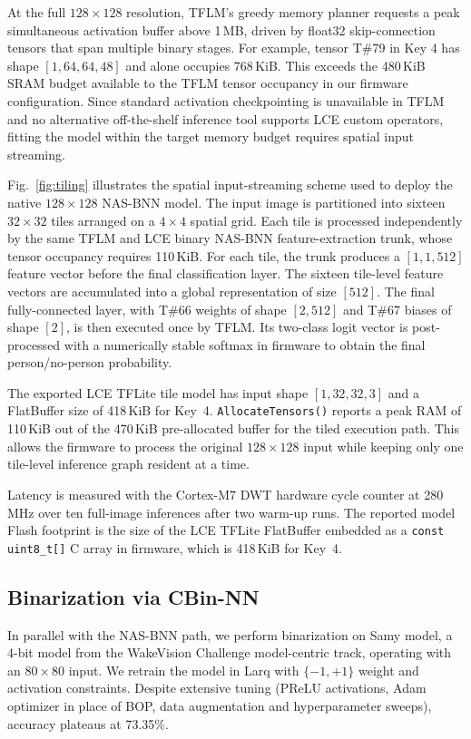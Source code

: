 \documentclass[conference]{IEEEtran}
\begin{document}
At the full $128 \times 128$ resolution, TFLM's greedy memory planner requests a peak simultaneous activation buffer above 1\,MB, driven by float32 skip-connection tensors that span multiple binary stages.
For example, tensor T\#79 in Key 4 has shape $[1,64,64,48]$ and alone occupies 768\,KiB.
This exceeds the 480\,KiB SRAM budget available to the TFLM tensor occupancy in our firmware configuration.
Since standard activation checkpointing is unavailable in TFLM and no alternative off-the-shelf inference tool supports LCE custom operators, fitting the model within the target memory budget requires spatial input streaming.

Fig.~\ref{fig:tiling} illustrates the spatial input-streaming scheme used to deploy the native $128 \times 128$ NAS-BNN model.
The input image is partitioned into sixteen $32 \times 32$ tiles arranged on a $4 \times 4$ spatial grid.
Each tile is processed independently by the same TFLM and LCE binary NAS-BNN feature-extraction trunk, whose tensor occupancy requires 110\,KiB.
For each tile, the trunk produces a $[1,1,512]$ feature vector before the final classification layer.
The sixteen tile-level feature vectors are accumulated into a global representation of size $[512]$.
The final fully-connected layer, with T\#66 weights of shape $[2,512]$ and T\#67 biases of shape $[2]$, is then executed once by TFLM.
Its two-class logit vector is post-processed with a numerically stable softmax in firmware to obtain the final person/no-person probability.

The exported LCE TFLite tile model has input shape $[1,32,32,3]$ and a FlatBuffer size of 418\,KiB for Key~4.
\texttt{AllocateTensors()} reports a peak RAM of 110\,KiB out of the 470\,KiB pre-allocated buffer for the tiled execution path.
This allows the firmware to process the original $128 \times 128$ input while keeping only one tile-level inference graph resident at a time.

Latency is measured with the Cortex-M7 DWT hardware cycle counter at 280\,MHz over ten full-image inferences after two warm-up runs.
The reported model Flash footprint is the size of the LCE TFLite FlatBuffer embedded as a \texttt{const uint8\_t[]} C array in firmware, which is 418\,KiB for Key~4.

\subsection{Binarization via CBin-NN}
\label{subsec:samybin}

In parallel with the NAS-BNN path, we perform binarization on Samy model, a 4-bit model from the WakeVision Challenge model-centric track, operating with an $80 \times 80$ input.
We retrain the model in Larq with $\{-1,+1\}$ weight and activation constraints. Despite extensive tuning (PReLU activations, Adam optimizer in place of BOP, data augmentation and hyperparameter sweeps), accuracy plateaus at 73.35\%.
\end{document}
